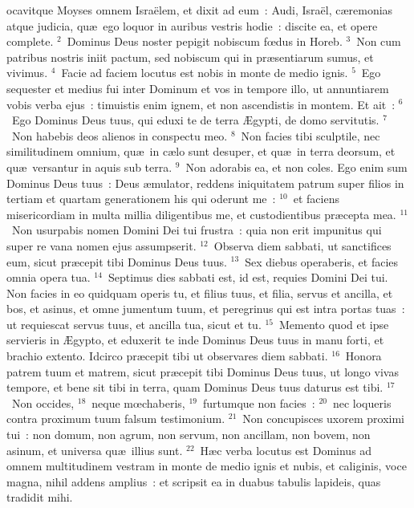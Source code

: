 \bchapter
{}ocavitque Moyses omnem Isra\"elem, et dixit ad eum~: Audi, Isra\"el, c\ae remonias atque judicia, qu\ae\ ego loquor in auribus vestris hodie~: discite ea, et opere complete.
${}^{2}$~Dominus Deus noster pepigit nobiscum fœdus in Horeb.
${}^{3}$~Non cum patribus nostris iniit pactum, sed nobiscum qui in pr\ae sentiarum sumus, et vivimus.
${}^{4}$~Facie ad faciem locutus est nobis in monte de medio ignis.
${}^{5}$~Ego sequester et medius fui inter Dominum et vos in tempore illo, ut annuntiarem vobis verba ejus~: timuistis enim ignem, et non ascendistis in montem. Et ait~:
${}^{6}$~Ego Dominus Deus tuus, qui eduxi te de terra \AE gypti, de domo servitutis.
${}^{7}$~Non habebis deos alienos in conspectu meo.
${}^{8}$~Non facies tibi sculptile, nec similitudinem omnium, qu\ae\ in c\ae lo sunt desuper, et qu\ae\ in terra deorsum, et qu\ae\ versantur in aquis sub terra.
${}^{9}$~Non adorabis ea, et non coles. Ego enim sum Dominus Deus tuus~: Deus \ae mulator, reddens iniquitatem patrum super filios in tertiam et quartam generationem his qui oderunt me~:
${}^{10}$~et faciens misericordiam in multa millia diligentibus me, et custodientibus pr\ae cepta mea.
${}^{11}$~Non usurpabis nomen Domini Dei tui frustra~: quia non erit impunitus qui super re vana nomen ejus assumpserit.
${}^{12}$~Observa diem sabbati, ut sanctifices eum, sicut pr\ae cepit tibi Dominus Deus tuus.
${}^{13}$~Sex diebus operaberis, et facies omnia opera tua.
${}^{14}$~Septimus dies sabbati est, id est, requies Domini Dei tui. Non facies in eo quidquam operis tu, et filius tuus, et filia, servus et ancilla, et bos, et asinus, et omne jumentum tuum, et peregrinus qui est intra portas tuas~: ut requiescat servus tuus, et ancilla tua, sicut et tu.
${}^{15}$~Memento quod et ipse servieris in \AE gypto, et eduxerit te inde Dominus Deus tuus in manu forti, et brachio extento. Idcirco pr\ae cepit tibi ut observares diem sabbati.
${}^{16}$~Honora patrem tuum et matrem, sicut pr\ae cepit tibi Dominus Deus tuus, ut longo vivas tempore, et bene sit tibi in terra, quam Dominus Deus tuus daturus est tibi.
${}^{17}$~Non occides,
${}^{18}$~neque mœchaberis,
${}^{19}$~furtumque non facies~:
${}^{20}$~nec loqueris contra proximum tuum falsum testimonium.
${}^{21}$~Non concupisces uxorem proximi tui~: non domum, non agrum, non servum, non ancillam, non bovem, non asinum, et universa qu\ae\ illius sunt.
${}^{22}$~H\ae c verba locutus est Dominus ad omnem multitudinem vestram in monte de medio ignis et nubis, et caliginis, voce magna, nihil addens amplius~: et scripsit ea in duabus tabulis lapideis, quas tradidit mihi.


